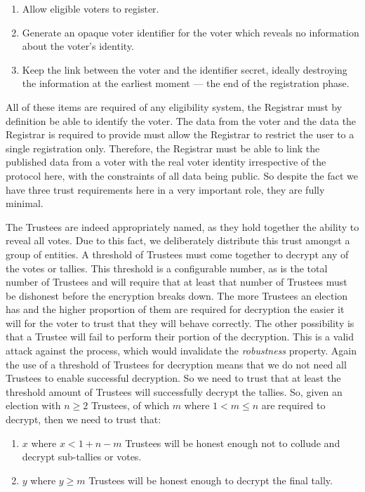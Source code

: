 \begin{enumerate}
    \item Allow eligible voters to register.
    \item Generate an opaque voter identifier for the voter which reveals no information about the voter's identity.
    \item Keep the link between the voter and the identifier secret, ideally destroying the information at the earliest moment --- the end of the registration phase.
\end{enumerate}

All of these items are required of any eligibility system, the Registrar must by definition be able to identify the voter. The data from the voter and the data the Registrar is required to provide must allow the Registrar to restrict the user to a single registration only. Therefore, the Registrar must be able to link the published data from a voter with the real voter identity irrespective of the protocol here, with the constraints of all data being public. So despite the fact we have three trust requirements here in a very important role, they are fully minimal.

The Trustees are indeed appropriately named, as they hold together the ability to reveal all votes. Due to this fact, we deliberately distribute this trust amongst a group of entities. A threshold of Trustees must come together to decrypt any of the votes or tallies. This threshold is a configurable number, as is the total number of Trustees and will require that at least that number of Trustees must be dishonest before the encryption breaks down. The more Trustees an election has and the higher proportion of them are required for decryption the easier it will for the voter to trust that they will behave correctly. The other possibility is that a Trustee will fail to perform their portion of the decryption. This is a valid attack against the process, which would invalidate the \emph{robustness} property. Again the use of a threshold of Trustees for decryption means that we do not need all Trustees to enable successful decryption. So we need to trust that at least the threshold amount of Trustees will successfully decrypt the tallies. So, given an election with $n \geq 2$ Trustees, of which $m$ where $1 < m \leq n$ are required to decrypt, then we need to trust that:

\begin{enumerate}
    \item $x$ where $x < 1 + n - m$ Trustees will be honest enough not to collude and decrypt sub-tallies or votes.
    \item $y$ where $y \geq m$ Trustees will be honest enough to decrypt the final tally.
\end{enumerate}

